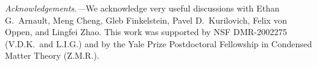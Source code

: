\documentclass[reprint,
superscriptaddress,
amsmath,
amssymb,
aps,
prl,
floatfix,
english
]{revtex4-2}
\begin{document}
\textit{Acknowledgements.---}We acknowledge very useful discussions with
Ethan G.~Arnault, Meng Cheng, Gleb Finkelstein, Pavel D.~Kurilovich, Felix von Oppen, and
Lingfei Zhao.
This work was supported by NSF DMR-2002275 (V.D.K.~and L.I.G.) and by the Yale Prize Postdoctoral Fellowship in Condensed Matter Theory (Z.M.R.).


\end{document}
